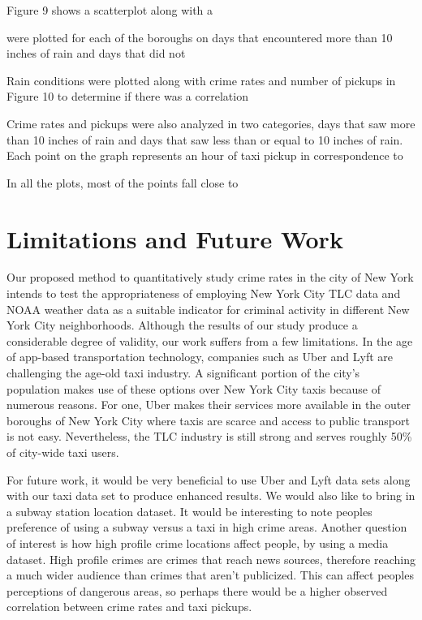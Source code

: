 \documentclass{sigkddExp}
\begin{document}
Figure 9 shows a scatterplot along with a 


 were  plotted for each of the boroughs on days that encountered more than 10 inches of rain and days that did not 

Rain conditions were plotted along with crime rates and number of pickups in Figure 10 to determine if there was a correlation

Crime rates and pickups were also analyzed in two categories, days that saw more than 10 inches of rain and days that saw less than or equal to 10 inches of rain. Each point on the graph represents an hour of taxi pickup in correspondence to 







In all the plots, most of the points fall close to  

\section{Limitations and Future Work}
Our proposed method to quantitatively study crime rates in the city of New York intends to test the appropriateness of employing New York City TLC data and NOAA weather data as a suitable indicator for criminal activity in different New York City neighborhoods. Although the results of our study produce a considerable degree of validity, our work suffers from a few limitations. 
In the age of app-based transportation technology, companies such as Uber and Lyft are challenging the age-old taxi industry. 
A significant portion of the city's population makes use of these options over New York City taxis because of numerous reasons. 
For one, Uber makes their services more available in the outer boroughs of New York City where taxis are scarce and access to public transport is not easy. Nevertheless, the TLC industry is still strong and serves roughly 50\% of city-wide taxi users.

For future work, it would be very beneficial to use Uber and Lyft data sets along with our taxi data set to produce enhanced results. We would also like to bring in a subway station location dataset. It would be interesting to note peoples preference of using a subway versus a taxi in high crime areas. Another question of interest is how high profile crime locations affect people, by using a media dataset. High profile crimes are crimes that reach news sources, therefore reaching a much wider audience than crimes that aren't publicized. This can affect peoples perceptions of dangerous areas, so perhaps there would be a higher observed correlation between crime rates and taxi pickups. 
\end{document}
